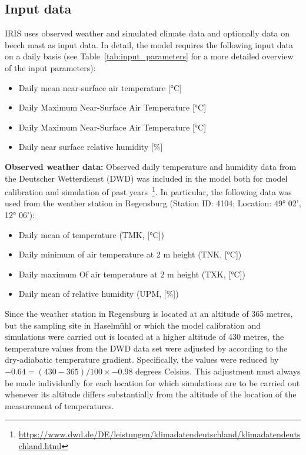 \documentclass[a4paper, 11pt]{scrartcl}
\begin{document}
\subsection{Input data}\label{input_data}
IRIS uses observed weather and simulated climate data and optionally data on beech mast as input data. In detail, the model requires the following input data on a daily basis (see Table~\ref{tab:input_parameters} for a more detailed overview of the input parameters):

\begin{itemize}[noitemsep]
\item Daily mean near-surface air temperature [°C]
\item Daily Maximum Near-Surface Air Temperature [°C]
\item Daily Maximum Near-Surface Air Temperature [°C]
\item Daily near surface relative humidity [\%]
\end{itemize}

\textbf{Observed weather data:} Observed daily temperature and humidity data from the Deutscher Wetterdienst (DWD) was included in the model both for model calibration and simulation of past years~\footnote{\url{https://www.dwd.de/DE/leistungen/klimadatendeutschland/klimadatendeutschland.html}}. In particular, the following data was used from the weather station in Regensburg (Station ID: 4104; Location: 49° 02', 12° 06'):

\begin{itemize}[noitemsep]
	\item Daily mean of temperature (TMK, [°C])
	\item Daily minimum of air temperature at 2 m height (TNK, [°C])
	\item Daily maximum Of air temperature at 2 m height (TXK, [°C])
	\item Daily mean of relative humidity (UPM, [\%])
\end{itemize}

Since the weather station in Regensburg is located at an altitude of 365 metres, but the sampling site in Haselmühl or which the model calibration and simulations were carried out is located at a higher altitude of 430 metres, the temperature values from the DWD data set were adjusted by according to the dry-adiabatic temperature gradient. Specifically, the values were reduced by $-0.64 = (430 - 365) / 100 \times -0.98$ degrees Celsius. This adjustment must always be made individually for each location for which simulations are to be carried out whenever its altitude differs substantially from the altitude of the location of the measurement of temperatures.
\end{document}

